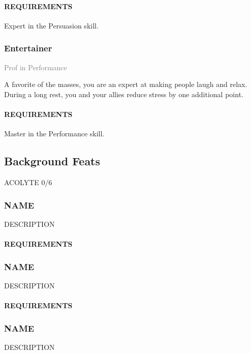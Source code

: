\paragraph{REQUIREMENTS} Expert in the Persuasion skill.

\subsubsection{Entertainer} \label{feat::entertainer}
\small{\textcolor{gray}{Prof in Performance}}

\normalsize
A favorite of the masses, you are an expert at making people laugh and relax.
During a long rest, you and your allies reduce stress by one additional point.
\paragraph{REQUIREMENTS} Master in the Performance skill.

\subsection*{Background Feats} %
ACOLYTE 0/6
    \subsubsection{NAME} \label{feat::NAME}
    DESCRIPTION
    \paragraph{REQUIREMENTS}

    \subsubsection{NAME} \label{feat::NAME}
    DESCRIPTION
    \paragraph{REQUIREMENTS}

    \subsubsection{NAME} \label{feat::NAME}
    DESCRIPTION
